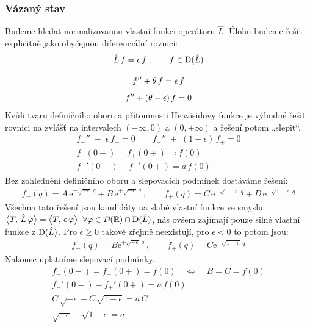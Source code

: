 \documentclass{article}
\newcommand{\const}[1]{\text{#1}}
\newcommand{\e}[1]{\const{e}^{#1}}
\newcommand{\R}{\mathbb{R}}
\begin{document}
\subsubsection*{Vázaný stav}
Budeme hledat normalizovanou vlastní funkci operátoru $\hat L$. Úlohu budeme řešit explicitně jako obyčejnou diferenciální rovnici:
\begin{gather*}
    \hat L \, f = \epsilon \, f \: ,
    \qquad
    f \in {\rm D}(\hat L)
    \\[10pt]
    f'' + \theta \, f = \epsilon \, f
    \\[5pt]
    f'' + (\theta - \epsilon) \, f = 0
\end{gather*}
Kvůli tvaru definičního oboru a přítomnosti Heavisidovy funkce je výhodné řešit rovnici na zvlášť na intervalech $(-\infty, 0)$ a $(0, +\infty)$ a řešení potom „slepit“.
\begin{gather*}
    f_-'' \; - \; \epsilon \, f_- = 0
    \qquad
    f_+'' \; + \; (1-\epsilon) \, f_+ = 0
    \\[5pt]
    f_-(0-) = f_+(0+) \eqqcolon f(0)
    \\[5pt]
    f_-'(0-) - f_+'(0+) = a \, f(0)
\end{gather*}
Bez zohlednění definičního oboru a slepovacích podmínek dostáváme řešení:
\begin{gather*}
    f_-(q) = A \, \e{-\sqrt{-\epsilon \,} \, q} + B \, \e{+\sqrt{-\epsilon \,} \, q}
    \: , \qquad
    f_+(q) = C \, \e{-\sqrt{1-\epsilon \,} \, q} + D \, \e{+\sqrt{1-\epsilon \,} \, q}
\end{gather*}
Všechna tato řešení jsou kandidáty na slabé vlastní funkce ve smyslu $\big<T,\, \hat L \, \varphi \big> = \big<T,\, \epsilon \, \varphi \big> \;\; \forall \varphi \in \mathcal{D}(\R) \cap {\rm D}(\hat L)$, nás ovšem zajímají pouze silné vlastní funkce z ${\rm D}(\hat L)$. Pro $\epsilon \geq 0$ takové zřejmě neexistují, pro $\epsilon < 0$ to potom jsou:
\begin{gather*}
    f_-(q) = B \e{+\sqrt{-\epsilon \,} \, q}
    \: , \qquad
    f_+(q) = C \e{-\sqrt{1-\epsilon \,} \, q}
\end{gather*}
Nakonec uplatníme slepovací podmínky.
\begin{gather*}
    f_-(0-) = f_+(0+) = f(0)
    \quad \Longleftrightarrow \quad
    B = C = f(0)
    \\[15pt]
    f_-'(0-) - f_+'(0+) = a \, f(0) \\[5pt]
    C \, \sqrt{-\epsilon} - C \, \sqrt{1 - \epsilon} = a \, C \\[5pt]
    \sqrt{-\epsilon} - \sqrt{1 - \epsilon} = a
\end{gather*}
\end{document}
